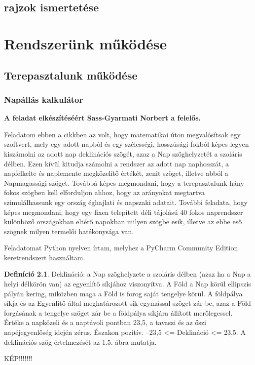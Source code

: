 \documentclass[
]{thesis-ekf}
\theoremstyle{definition}
\newtheorem{definicio}[tetel]{Definíció}
\theoremstyle{remark}
\begin{document}
	\section{rajzok ismertetése}

\chapter{Rendszerünk működése}
	\section{Terepasztalunk működése}
		\subsection{Napállás kalkulátor}
			\textbf{A feladat elkészítéséért Sass-Gyarmati Norbert a felelős.} 
			\par Feladatom ebben a cikkben az volt, hogy matematikai úton megvalósítsak egy szoftvert, mely egy adott napból és egy szélességi, hosszúsági fokból képes legyen kiszámolni az adott nap deklinációs szögét, azaz a Nap szöghelyzetét a szoláris délben. Ezen kívül kitudja számolni a rendszer az adott nap naphosszát, a napfelkelte és naplemente megközelítő értékét, zenit szöget, illetve abból a Napmagassági szöget. Továbbá képes megmondani, hogy a terepasztalunk hány fokos szögben kell elforduljon ahhoz, hogy az arányokat megtartva szimulálhassunk egy ország éghajlati és napszaki adatait. További feladata, hogy képes megmondani, hogy egy fixen telepített déli tájolású 40 fokos naprendszer különböző országokban eltérő napokban milyen szögbe esik, illetve az ebbe eső szögnek milyen termelői hatékonysága van.
			\par Feladatomat Python nyelven írtam, melyhez a PyCharm Community Edition keretrendszert használtam. 
			\begin{definicio}
				Deklináció: a Nap szöghelyzete a szoláris délben (azaz ha a Nap a helyi délkörön van) az egyenlítő síkjához viszonyítva. A Föld a Nap körül ellipszis pályán kering, miközben maga a Föld is forog saját tengelye körül. A földpálya síkja és az Egyenlítő által meghatározott sík egymással szöget zár be, azaz a Föld forgásának a tengelye szöget zár be a földpálya síkjára állított merőlegessel. Értéke a napközeli és a naptávoli pontban 23,5, a tavaszi és az őszi napéjegyenlőség idején zérus. Északon pozitív. –23,5 <=  Deklináció <= 23,5. A deklinációs szög értelmezését az 1.5. ábra mutatja.
				\par KÉP!!!!!!!
				\cite{Kornyezet}
			\end{definicio}
\end{document}
